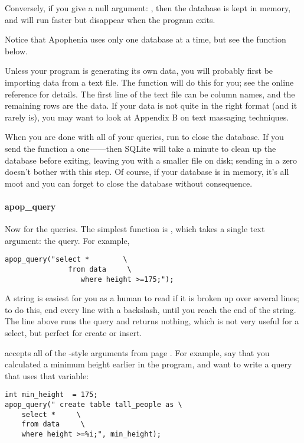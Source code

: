 Conversely, if you give a null argument: ,
then the database is kept in memory, and will run faster but 
disappear when the program exits.

Notice that Apophenia uses only one database at a time, but
see the  function below.

Unless your program is generating its own data, you will probably
first be importing data from a text file.  The 
function will do this for you; see the online reference for details. The
first line of the text file can be column names, and the remaining rows
are the data. If your data is not quite in the right format (and it
rarely is), you may want to look at Appendix B on text
massaging techniques.

When you are done with all of your queries, run
 to close the database. If you send the function a
one------then SQLite will take a minute to clean
up the database before exiting, leaving you with a smaller file on disk;
sending in a zero doesn't bother with this step. Of course, if your
database is in memory, it's all moot and you can forget to close the
database without consequence.


\paragraph{apop\_query} Now for the queries. The simplest function
is , which takes a single text argument: the
query. For example,
\setc {}
\begin{lstlisting}
apop_query("select *        \
               from data     \
                  where height >=175;");
\end{lstlisting}

A string is easiest for you as a human to read if it is
broken up over several lines; to do this, end every line with a
backslash, until you reach the end of the string. The line above runs
the query and returns nothing, which is not very useful for a \si{select}, but perfect for
\si{create} or \si{insert}.

 accepts all of the -style arguments from page \pageref{printf}. For example,
say that you calculated a minimum height earlier in the program, and want
to write a query that uses that variable:
\begin{lstlisting}
int min_height	= 175;
apop_query(" create table tall_people as \
    select *     \
    from data     \
    where height >=%i;", min_height);
\end{lstlisting}

